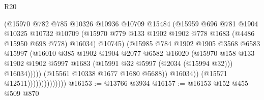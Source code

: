 \begin{lexlean}{R20}
\begin{coremodule}
                                      (@15970
                                        @782
                                        @785
                                        @10326
                                        @10936
                                        @10709
                                        @15484
                                        (@15959
                                          @696
                                          @781
                                          @1904
                                          @10325
                                          @10732
                                          @10709
                                          (@15970
                                            @779
                                            @133
                                            @1902
                                            @1902
                                            @778
                                            @1683
                                            (@4486 @15950 @698 @778)
                                            @16034)
                                          @10745)
                                        (@15985
                                          @784
                                          @1902
                                          @1905
                                          @3568
                                          @6583
                                          @15997
                                          (@16010
                                            @385
                                            @1902
                                            @1904
                                            @2077
                                            @6582
                                            @16020
                                            (@15970
                                              @158
                                              @133
                                              @1902
                                              @1902
                                              @5997
                                              @1683
                                              (@15991 @32 @5997 (@2034 (@15994 @32)))
                                              @16034)))))
                                    (@15561 @10338 @1677 @1680 @5688))
                                  @16034))
                              (@15571 @12511))))))))))))))
@16153 := @13766 @3934
@16157 := @16153 @152 @455 @509 @870

\end{coremodule}
\end{lexlean}
